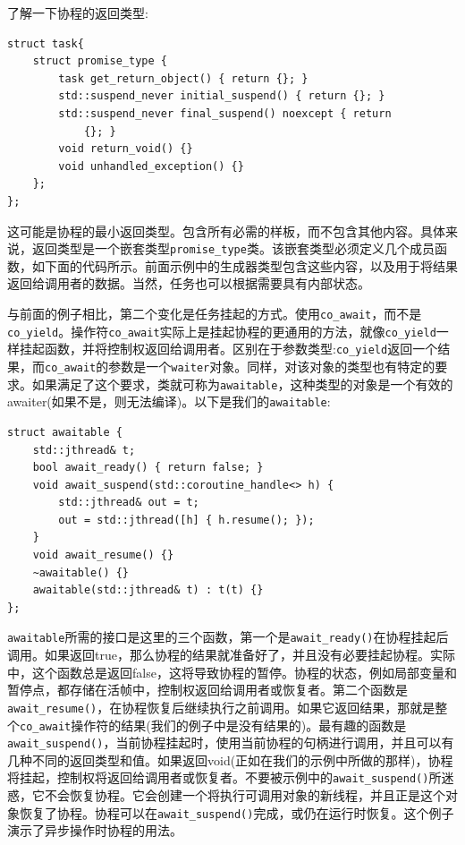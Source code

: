 了解一下协程的返回类型:

\begin{lstlisting}[style=styleCXX]
struct task{
	struct promise_type {
		task get_return_object() { return {}; }
		std::suspend_never initial_suspend() { return {}; }
		std::suspend_never final_suspend() noexcept { return 
			{}; }
		void return_void() {}
		void unhandled_exception() {}
	};
};
\end{lstlisting}

这可能是协程的最小返回类型。包含所有必需的样板，而不包含其他内容。具体来说，返回类型是一个嵌套类型\texttt{promise\_type}类。该嵌套类型必须定义几个成员函数，如下面的代码所示。前面示例中的生成器类型包含这些内容，以及用于将结果返回给调用者的数据。当然，任务也可以根据需要具有内部状态。

与前面的例子相比，第二个变化是任务挂起的方式。使用\texttt{co\_await}，而不是\texttt{co\_yield}。操作符\texttt{co\_await}实际上是挂起协程的更通用的方法，就像\texttt{co\_yield}一样挂起函数，并将控制权返回给调用者。区别在于参数类型:\texttt{co\_yield}返回一个结果，而\texttt{co\_await}的参数是一个\texttt{waiter}对象。同样，对该对象的类型也有特定的要求。如果满足了这个要求，类就可称为\texttt{awaitable}，这种类型的对象是一个有效的awaiter(如果不是，则无法编译)。以下是我们的\texttt{awaitable}:

\begin{lstlisting}[style=styleCXX]
struct awaitable {
	std::jthread& t;
	bool await_ready() { return false; }
	void await_suspend(std::coroutine_handle<> h) {
		std::jthread& out = t;
		out = std::jthread([h] { h.resume(); });
	}
	void await_resume() {}
	~awaitable() {}
	awaitable(std::jthread& t) : t(t) {}
};
\end{lstlisting}

\texttt{awaitable}所需的接口是这里的三个函数，第一个是\texttt{await\_ready()}在协程挂起后调用。如果返回true，那么协程的结果就准备好了，并且没有必要挂起协程。实际中，这个函数总是返回false，这将导致协程的暂停。协程的状态，例如局部变量和暂停点，都存储在活帧中，控制权返回给调用者或恢复者。第二个函数是\texttt{await\_resume()}，在协程恢复后继续执行之前调用。如果它返回结果，那就是整个\texttt{co\_await}操作符的结果(我们的例子中是没有结果的)。最有趣的函数是\texttt{await\_suspend()}，当前协程挂起时，使用当前协程的句柄进行调用，并且可以有几种不同的返回类型和值。如果返回void(正如在我们的示例中所做的那样)，协程将挂起，控制权将返回给调用者或恢复者。不要被示例中的\texttt{await\_suspend()}所迷惑，它不会恢复协程。它会创建一个将执行可调用对象的新线程，并且正是这个对象恢复了协程。协程可以在\texttt{await\_suspend()}完成，或仍在运行时恢复。这个例子演示了异步操作时协程的用法。 

